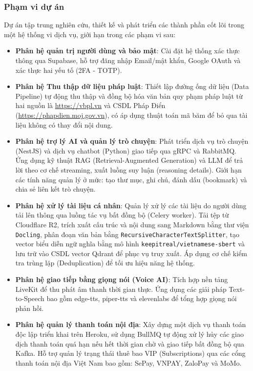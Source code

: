 \subsubsection{Phạm vi dự án}

Dự án tập trung nghiên cứu, thiết kế
và phát triển các thành phần cốt lõi
trong một hệ thống vi dịch vụ,
giới hạn trong các phạm vi sau:

\begin{itemize}

\item \textbf{Phân hệ quản trị người dùng và bảo mật}:
Cài đặt hệ thống xác thực thông qua Supabase,
hỗ trợ đăng nhập Email/mật khẩu,
Google OAuth và xác thực hai yếu tố (2FA - TOTP).

\item \textbf{Phân hệ Thu thập dữ liệu pháp luật}:
Thiết lập đường ống dữ liệu (Data Pipeline)
tự động thu thập và đồng bộ hóa văn bản quy phạm pháp luật
từ hai nguồn là \url{https://vbpl.vn}
và CSDL Pháp Điển (\url{https://phapdien.moj.gov.vn}),
có áp dụng thuật toán mã băm để bỏ qua tài liệu không có thay đổi nội dung.

\item \textbf{Phân hệ trợ lý AI và quản lý trò chuyện}:
Phát triển dịch vụ trò chuyện (NestJS) và dịch vụ chatbot (Python) giao tiếp qua gRPC và RabbitMQ.
Ứng dụng kỹ thuật RAG (Retrieval-Augmented Generation) và LLM để trả lời theo cơ chế streaming, xuất luồng suy luận (reasoning details).
Giới hạn các tính năng quản lý ở mức: tạo thư mục, ghi chú, đánh dấu (bookmark) và chia sẻ liên kết trò chuyện.

\item \textbf{Phân hệ xử lý tài liệu cá nhân}:
Quản lý xử lý các tài liệu do người dùng tải lên thông qua luồng tác vụ bất đồng bộ (Celery worker).
Tải tệp từ Cloudflare R2,
trích xuất cấu trúc và nội dung sang Markdown bằng thư viện \texttt{Docling}, phân đoạn văn bản bằng \texttt{RecursiveCharacterTextSplitter}, tạo vector biểu diễn ngữ nghĩa bằng mô hình \texttt{keepitreal/vietnamese-sbert} và lưu trữ vào CSDL vector Qdrant để phục vụ truy xuất. Áp dụng cơ chế kiểm tra trùng lặp (Deduplication) để tối ưu hiệu năng hệ thống.

\item \textbf{Phân hệ giao tiếp bằng giọng nói (Voice AI)}:
Tích hợp nền tảng LiveKit để thu phát âm thanh thời gian thực. Ứng dụng các giải pháp Text-to-Speech bao gồm edge-tts, piper-tts và elevenlabs để tổng hợp giọng nói phản hồi.

\item \textbf{Phân hệ quản lý thanh toán nội địa}:
Xây dựng một dịch vụ thanh toán độc lập triển khai trên Heroku,
sử dụng BullMQ
tự động
xử lý hủy các giao dịch thanh toán quá hạn nếu hết thời gian chờ
và
giao tiếp bất đồng bộ qua Kafka.
Hỗ trợ quản lý trạng thái
thuê bao VIP (Subscriptions)
qua các cổng thanh toán nội địa Việt Nam bao gồm: SePay, VNPAY, ZaloPay và MoMo.
\end{itemize}
